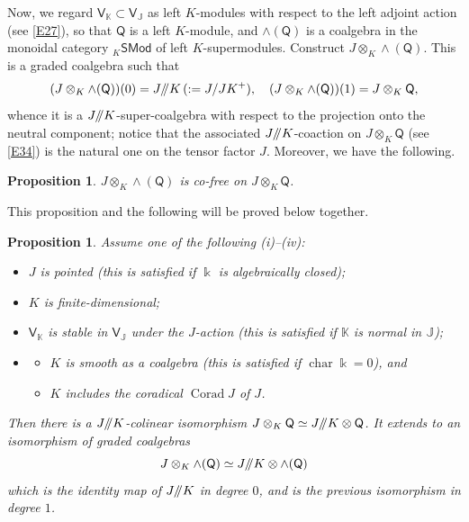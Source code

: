 \documentclass[11pt, a4paper]{amsart}
\newtheorem{prop}[theorem]{Proposition}
\theoremstyle{definition}
\numberwithin{equation}{section}
\begin{document}
Now, we regard $\mathsf{V}_{\mathbb{K}} \subset \mathsf{V}_{\mathbb{J}}$ as left $K$-modules with respect to the left adjoint action (see \eqref{E27}), 
so that $\mathsf{Q}$ is a left $K$-module, and $\wedge(\mathsf{Q})$ is a coalgebra in the monoidal
category $_{K}\mathsf{SMod}$ of left $K$-supermodules.
Construct $J \otimes_{K} \wedge(\mathsf{Q})$.
This is a graded coalgebra such that 
\begin{equation}\label{E41c}
(J \otimes_{K} \wedge(\mathsf{Q}))(0)=J/\hspace{-1mm}/K\, (:=J/JK^+),\quad
(J \otimes_{K} \wedge(\mathsf{Q}))(1)=J \otimes_{K}\mathsf{Q},
\end{equation}
whence it is a $J/\hspace{-1mm}/K$-super-coalgebra with respect to the projection onto the neutral component;
notice that the associated $J/\hspace{-1mm}/K$-coaction on $J \otimes_{K}\mathsf{Q}$ (see \eqref{E34})
is the natural one on the tensor factor $J$. 
Moreover, we have the following.

\begin{prop}\label{P42}
$J \otimes_{K} \wedge(\mathsf{Q})$ is co-free on $J \otimes_{K} \mathsf{Q}$.
\end{prop}

This proposition and the following will be proved below together.

\begin{prop}\label{P43}
Assume one of the following (i)--(iv):
\begin{itemize}
\item[(i)] $J$ is pointed (this is satisfied if $\Bbbk$ is algebraically closed);
\item[(ii)] $K$ is finite-dimensional;
\item[(iii)] $\mathsf{V}_{\mathbb{K}}$ is stable in $\mathsf{V}_{\mathbb{J}}$ under the $J$-action (this is satisfied if $\mathbb{K}$ is normal in $\mathbb{J}$);
\item[(iv)] 
\begin{itemize}
\item[(a)] $K$ is smooth as a coalgebra (this is satisfied if $\operatorname{char}\Bbbk = 0$), and 
\item[(b)] $K$ includes the coradical $\operatorname{Corad} J$ of $J$.
\end{itemize}
\end{itemize}
Then there is a $J/\hspace{-1mm}/K$-colinear isomorphism $J \otimes_{K} \mathsf{Q}\simeq J/\hspace{-1mm}/K \otimes \mathsf{Q}$. It extends to an isomorphism of graded coalgebras
\begin{equation}\label{E42}
J \otimes_{K} \wedge(\mathsf{Q}) \simeq J/\hspace{-1mm}/K \otimes \wedge(\mathsf{Q})
\end{equation}
which is the identity map of $J/\hspace{-1mm}/K$ in degree $0$, and is the 
previous isomorphism in degree $1$.
\end{prop}
\end{document}
